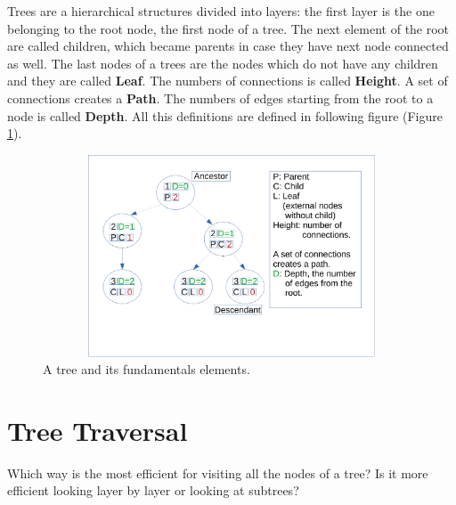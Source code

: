 Trees are a hierarchical structures divided into layers: the first layer is the one belonging to the root node, the first node of a tree. The next element of the root are called children, which became parents in case they have next node connected as well. The last nodes of a trees are the nodes which do not have any children and they are called \textbf{Leaf}. The numbers of connections is called \textbf{Height}. A set of connections creates a \textbf{Path}. The numbers of edges starting from the root to a node is called \textbf{Depth}.
All this definitions are defined in following figure (Figure \ref{trees_3}).

\begin{figure}[hb]
	\includegraphics[width=14cm,height=6cm]{chapters/trees/images/trees_3.pdf}
	\caption[]{A tree and its fundamentals elements.}
	\label{trees_3}
\end{figure}

\section{Tree Traversal}
Which way is the most efficient for visiting all the nodes of a tree? Is it more efficient looking layer by layer or looking at subtrees?